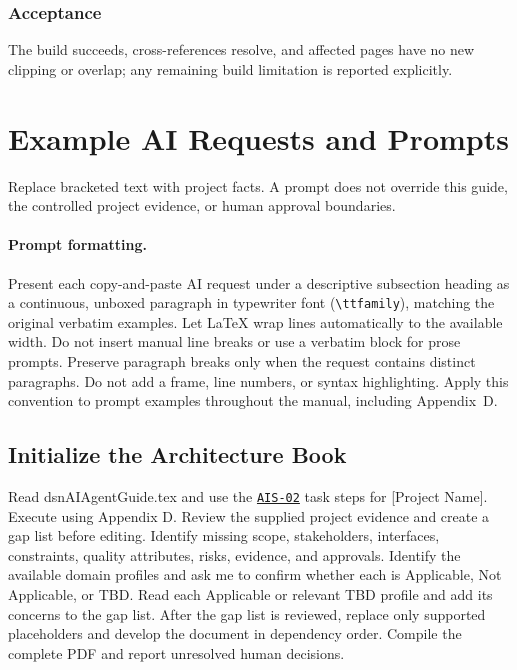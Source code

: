 \subsubsection*{Acceptance}
\label{Section:AIBuildAcceptance}
The build succeeds, cross-references resolve, and affected pages have no new clipping or overlap; any remaining build limitation is reported explicitly.

\section{Example AI Requests and Prompts}
\label{Section:AIExamplePrompts}
Replace bracketed text with project facts. A prompt does not override this
guide, the controlled project evidence, or human approval boundaries.

\paragraph{Prompt formatting.}\label{Section:AIPromptFormatting}
Present each copy-and-paste AI request under a descriptive subsection heading
as a continuous, unboxed paragraph in typewriter font (\texttt{\textbackslash ttfamily}), matching the original
verbatim examples.
Let LaTeX wrap lines automatically to the available width. Do not insert manual
line breaks or use a verbatim block for prose prompts. Preserve paragraph
breaks only when the request contains distinct paragraphs. Do not add a frame,
line numbers, or syntax highlighting. Apply this convention
to prompt examples throughout the manual, including Appendix~D.

\subsection{Initialize the Architecture Book}
\label{Section:AIInitializePrompt}
\begingroup\ttfamily\raggedright
\noindent Read dsnAIAgentGuide.tex and use the \hyperref[Skill:AIS-02]{\texttt{AIS-02}} task steps for [Project Name]. Execute using Appendix D. Review the supplied project evidence and create a gap list before editing. Identify missing scope, stakeholders, interfaces, constraints, quality attributes, risks, evidence, and approvals. Identify the available domain profiles and ask me to confirm whether each is Applicable, Not Applicable, or TBD. Read each Applicable or relevant TBD profile and add its concerns to the gap list. After the gap list is reviewed, replace only supported placeholders and develop the document in dependency order. Compile the complete PDF and report unresolved human decisions.\par
\endgroup


